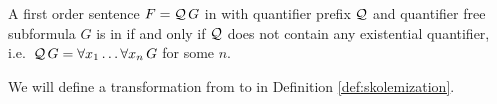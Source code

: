 \begin{definition}[\SNF]\label{def:skolem:normal:form}
	A first order sentence \( F = \mathcal{Q}\,G \) in \PNF 
	with quantifier prefix \( \mathcal{Q} \) 
	and quantifier free subformula \( G \)
	is in 
	if and only if \( \mathcal{Q} \) does not contain any existential quantifier,
	i.e.~\( \mathcal{Q}\, G = \forall x_1 \ldots \forall x_n \, G \) for some \( n \).
\end{definition}

We will define a transformation from \PNF to \SNF in Definition \vref{def:skolemization}.


